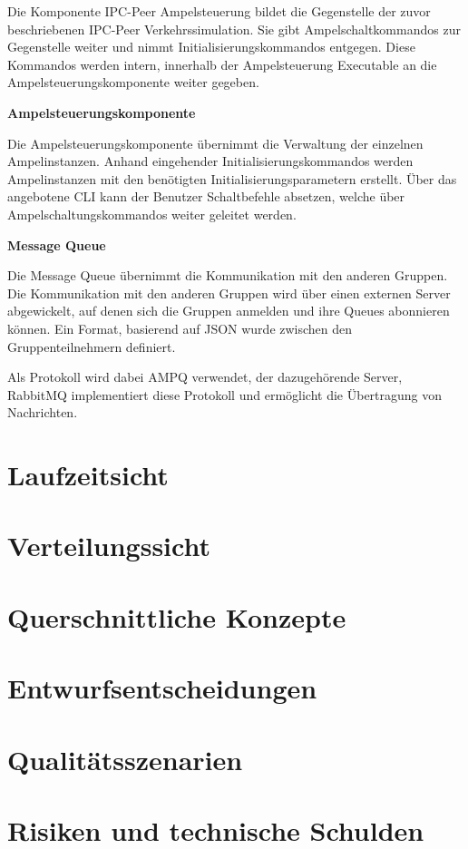 Die Komponente IPC-Peer Ampelsteuerung bildet die Gegenstelle der zuvor beschriebenen IPC-Peer Verkehrssimulation. Sie gibt Ampelschaltkommandos zur Gegenstelle weiter und nimmt Initialisierungskommandos entgegen. Diese Kommandos werden intern, innerhalb der Ampelsteuerung Executable an die Ampelsteuerungskomponente weiter gegeben.

\begin{flushleft}
\textbf{Ampelsteuerungskomponente}
\end{flushleft}
\vspace{-0.3 cm}

Die Ampelsteuerungskomponente übernimmt die Verwaltung der einzelnen Ampelinstanzen. Anhand eingehender Initialisierungskommandos werden Ampelinstanzen mit den benötigten Initialisierungsparametern erstellt. Über das angebotene CLI kann der Benutzer Schaltbefehle absetzen, welche über Ampelschaltungskommandos weiter geleitet werden.

\begin{flushleft}
\textbf{Message Queue}
\end{flushleft}
\vspace{-0.3 cm}

Die Message Queue übernimmt die Kommunikation mit den anderen Gruppen. Die Kommunikation mit den anderen Gruppen wird über einen externen Server abgewickelt, auf denen sich die Gruppen anmelden und ihre Queues abonnieren können. Ein Format, basierend auf JSON wurde zwischen den Gruppenteilnehmern definiert.

Als Protokoll wird dabei AMPQ verwendet, der dazugehörende Server, RabbitMQ implementiert diese Protokoll und ermöglicht die Übertragung von Nachrichten.

\section{Laufzeitsicht}
\label{Laufzeitsicht}

\section{Verteilungssicht}
\label{Verteilungssicht}

\section{Querschnittliche Konzepte}
\label{Querschnittliche Konzepte}

\section{Entwurfsentscheidungen}
\label{Entwurfsentscheidungen}

\section{Qualitätsszenarien}
\label{Qualitätsszenarien}

\section{Risiken und technische Schulden}
\label{Risiken und technische Schulden}